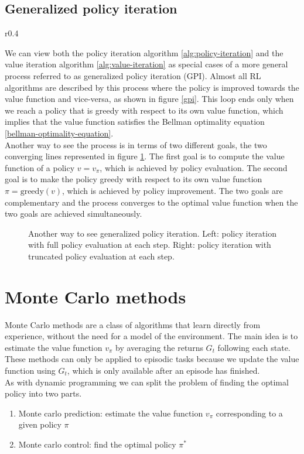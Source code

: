 \subsection{Generalized policy iteration}
\begin{wrapfigure}{r}{0.4\textwidth}
    \centering
    
    \caption{Generalized policy iteration loop}
    \label{gpi}
\end{wrapfigure} 
We can view both the policy iteration algorithm \ref{alg:policy-iteration} and the value iteration algorithm \ref{alg:value-iteration} as special cases of a more general process referred to as generalized policy iteration (GPI). Almost all RL algorithms are described by this process where the policy is improved towards the value function and vice-versa, as shown in figure \ref{gpi}. This loop ends only when we reach a policy that is greedy with respect to its own value function, which implies that the value function satisfies the Bellman optimality equation \ref{bellman-optimality-equation}.\\
Another way to see the process is in terms of two different goals, the two converging lines represented in figure \ref{gpi2}. The first goal is to compute the value function of a policy $v=v_{\pi}$, which is achieved by policy evaluation. The second goal is to make the policy greedy with respect to its own value function $\pi=\mathrm{greedy}(v)$, which is achieved by policy improvement. The two goals are complementary and the process converges to the optimal value function when the two goals are achieved simultaneously.
\begin{figure}[H]
    \centering
    
    \caption{Another way to see generalized policy iteration. Left: policy iteration with full policy evaluation at each step. Right: policy iteration with truncated policy evaluation at each step.}
    \label{gpi2}
\end{figure}

\section{Monte Carlo methods}
Monte Carlo methods are a class of algorithms that learn directly from experience, without the need for a model of the environment. The main idea is to estimate the value function $v_{\pi}$ by averaging the returns $G_t$ following each state. These methods can only be applied to episodic tasks because we update the value function using $G_t$, which is only available after an episode has finished.\\
As with dynamic programming we can split the problem of finding the optimal policy into two parts.
\begin{enumerate}
    \item Monte carlo prediction: estimate the value function $v_{\pi}$ corresponding to a given policy $\pi$
    \item Monte carlo control: find the optimal policy $\pi^*$
\end{enumerate}

